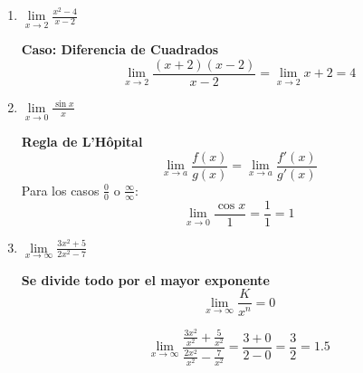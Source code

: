 \begin{enumerate}
    \item $ \lim\limits_{x \to 2} \frac{x^2 - 4}{x - 2} $
    
    \textbf{Caso: Diferencia de Cuadrados}
    \[ \lim\limits_{x \to 2} \frac{(x+2)(x-2)}{x-2} = \lim\limits_{x \to 2} x+2 = 4 \]
    
    \item $ \lim\limits_{x \to 0} \frac{\sin x}{x} $
    
    \textbf{Regla de L'Hôpital}
    \[ \lim\limits_{x \to a} \frac{f(x)}{g(x)} = \lim\limits_{x \to a} \frac{f'(x)}{g'(x)} \]
    Para los casos $ \frac{0}{0} $ o $ \frac{\infty}{\infty} $:
    \[ \lim\limits_{x \to 0} \frac{\cos x}{1} = \frac{1}{1} = 1 \]
    
    \item $ \lim\limits_{x \to \infty} \frac{3x^2 + 5}{2x^2 - 7} $
    
    \textbf{Se divide todo por el mayor exponente}
    \[ \lim\limits_{x \to \infty} \frac{K}{x^n} = 0 \]
    
    \[ \lim\limits_{x \to \infty} \frac{\frac{3x^2}{x^2} + \frac{5}{x^2}}{\frac{2x^2}{x^2} - \frac{7}{x^2}} = \frac{3 + 0}{2 - 0} = \frac{3}{2} = 1.5 \]
    
\end{enumerate}
